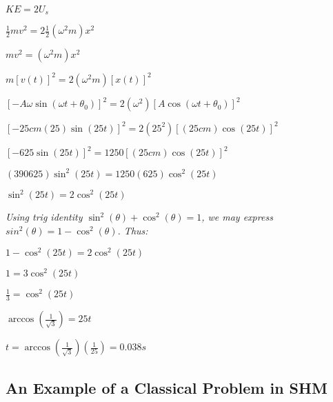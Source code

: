 \documentclass{article}
\begin{document}
\begin{center}
	$ KE = 2U_s
	$
	
	$\frac{1}{2}mv^2=2\frac{1}{2}(\omega^2m)x^2
	$
	
	$mv^2 = (\omega^2m)x^2
	$
	
	$m\left[v(t)\right]^2 = 2(\omega^2m)\left[x(t)\right]^2
	$
	
	$\left[-A\omega\sin(\omega t + \theta_0)\right]^2 = 2(\omega^2)\left[A\cos(\omega t + \theta_0)\right]^2
	$
	
	$\left[-25cm(25)\sin(25t)\right]^2 = 2(25^2)\left[(25cm)\cos(25t)\right]^2
	$
	
	$\left[-625\sin(25t)\right]^2 = 1250\left[(25cm)\cos(25t)\right]^2
    $
    
    $(390 625)\sin^2(25t) = 1250(625)\cos^2(25t)
    $
    
    $\sin^2(25t) = 2\cos^2(25t)
    $
    
    
 	\textit{Using trig identity $\sin^2(\theta) + \cos^2(\theta) = 1$, we may express $sin^2(\theta) = 1 - \cos^2(\theta)$. Thus:}
 	
 	$ 1 - \cos^2(25t) = 2\cos^2(25t)
 	$
 	
 	$ 1 = 3\cos^2(25t) 
 	$
 	
 	$ \frac{1}{3} = \cos^2(25t)
 	$
 	
 	$ \arccos\left(\frac{1}{\sqrt{3}}\right) = 25t
 	$
 	
 	$\boxed{t = \arccos\left(\frac{1}{\sqrt{3}}\right)\left(\frac{1}{25}\right) = 0.038s}
 	$
\end{center} 

\subsection{An Example of a Classical Problem in SHM}
\end{document}
